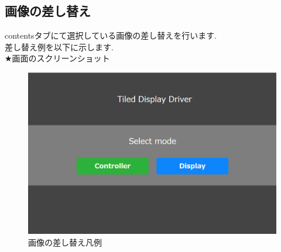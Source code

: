 \documentclass[a4paper,10pt,oneside]{jsbook}
\begin{document}
\subsection{画像の差し替え}
contentsタブにて選択している画像の差し替えを行います.\\
差し替え例を以下に示します.\\
★画面のスクリーンショット
\begin{figure}[htbp]
	\begin{center}
		\includegraphics[width=11.5cm]{image/home.png}
	\end{center}
	\caption{画像の差し替え凡例}
	\label{fig:replaceimage}
\end{figure}




\clearpage 

\end{document}
